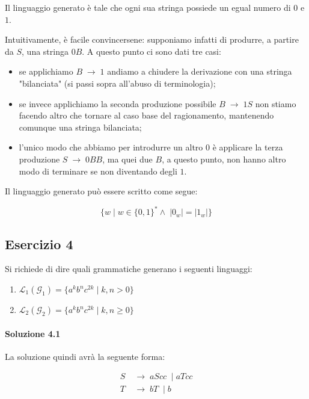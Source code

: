 \documentclass[class=book, crop=false, oneside, 12pt]{standalone}
\begin{document}
\noindent Il linguaggio generato è tale che ogni sua stringa possiede un egual numero di \(0\) e \(1\).

Intuitivamente, è facile convincersene: supponiamo infatti di produrre, a partire da \(S\), una stringa \(0B\). A questo punto ci sono dati tre casi:

\begin{itemize}
  \item se applichiamo \(B\; \to\; 1\) andiamo a chiudere la derivazione con una stringa "bilanciata" (si passi sopra all'abuso di terminologia);
  \item se invece applichiamo la seconda produzione possibile \(B\; \to\; 1S\) non stiamo facendo altro che tornare al caso base del ragionamento, mantenendo comunque una stringa bilanciata;
  \item l'unico modo che abbiamo per introdurre un altro \(0\) è applicare la terza produzione \(S\; \to\; 0BB\), ma quei due \(B\), a questo punto, non hanno altro modo di terminare se non diventando degli \(1\).
\end{itemize}

\noindent Il linguaggio generato può essere scritto come segue:

\begin{equation*}
  \{ w \mid w \in \{0, 1\}^* \land\; |0_w| = |1_w| \}
\end{equation*}

\subsection*{Esercizio 4}
Si richiede di dire quali grammatiche generano i seguenti linguaggi:

\begin{enumerate}
  \item \(\mathcal{L}_1(\mathcal{G}_1) = \{ a^k b^n c^{2k} \mid k, n > 0 \}\)
  \item \(\mathcal{L}_2(\mathcal{G}_2) = \{ a^k b^n c^{2k} \mid k, n \geq 0 \}\)
\end{enumerate}

\paragraph{Soluzione 4.1}
La soluzione quindi avrà la seguente forma:

\begin{align*}
  S\; &\to\; aScc\; \mid  aTcc \\
  T\; &\to\; bT\; \mid b
\end{align*}
\end{document}
